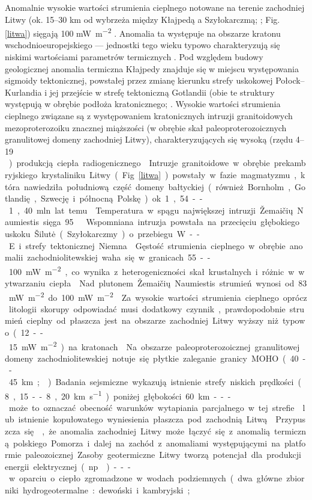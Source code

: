 \documentclass[11.5pt,twoside]{report}
\begin{document}
Anomalnie wysokie wartości strumienia cieplnego notowane na terenie zachodniej Litwy (ok. 15--30 km od wybrzeża między Kłajpedą a Szyłokarczmą; \cite{Lukosevicius.1993}; Fig. \ref{litwa}) sięgają 100 \si{\milli\watt\per\meter\squared} \parencite{Sliaupa.2012,Puura.2003}. Anomalia ta występuje na obszarze kratonu wschodnioeuropejskiego --- jednostki tego wieku typowo charakteryzują się niskimi wartościami parametrów termicznych \parencite{Suveizdis.2000}. Pod względem budowy geologicznej anomalia termiczna Kłajpedy znajduje się w miejscu występowania sigmoidy tektonicznej, powstałej przez zmianę kierunku strefy uskokowej Połock--Kurlandia i jej przejście w strefę tektoniczną Gotlandii (obie te struktury występują w obrębie podłoża kratonicznego; \parencite{Garetsky.2007}. Wysokie wartości strumienia cieplnego związane są z występowaniem kratonicznych intruzji granitoidowych mezoproterozoiku znacznej miąższości (w obrębie skał paleoproterozoicznych granulitowej domeny zachodniej Litwy), charakteryzujących się wysoką (rzędu 4--19 \si{\milli\watt\per\meter\cubic}) produkcją ciepła radiogenicznego \parencite{Sliaupa.2010,Sliaupa.2005,Motuza.2003}. Intruzje granitoidowe w obrębie prekambryjskiego krystaliniku Litwy (Fig. \ref{litwa}) powstały w fazie magmatyzmu, która nawiedziła południową część domeny bałtyckiej (również Bornholm, Gotlandię, Szwecję i północną Polskę) ok. 1,54--1,40 mln lat temu \parencite{Motuza.2008,Motuza.2006}. Temperatura w spągu największej intruzji Žemaičių Naumiestis sięga 95 \textcelsius \parencite{Sliaupa.2005}. Wspomniana intruzja powstała na przecięciu głębokiego uskoku Šilutė (Szyłokarczmy) o przebiegu W--E i strefy tektonicznej Niemna \parencite{Sliaupa.2005}. Gęstość strumienia cieplnego w obrębie anomalii zachodniolitewskiej waha się w granicach 55--100 \si{\milli\watt\per\meter\squared}, co wynika z heterogeniczności skał krustalnych i różnic w wytwarzaniu ciepła \parencite{Sliaupa.2005}. Nad plutonem Žemaičių Naumiestis strumień wynosi od 83 \si{\milli\watt\per\meter\squared} do 100 \si{\milli\watt\per\meter\squared} \parencite{Sliaupa.2005}. Za wysokie wartości strumienia cieplnego oprócz litologii skorupy odpowiadać musi dodatkowy czynnik, prawdopodobnie strumień cieplny od płaszcza jest na obszarze zachodniej Litwy wyższy niż typowo (12--15 \si{\milli\watt\per\meter\squared}) na kratonach \parencite{Motuza.2003}. Na obszarze paleoproterozoicznej granulitowej domeny zachodniolitewskiej notuje się płytkie zaleganie granicy MOHO (40--45 km; \cite{Sliaupa.2005,Suveizdis.2000}). Badania sejsmiczne wykazują istnienie strefy niskich prędkości (8,15--8,20 \si{\kilo\metre\per\second}) poniżej głębokości 60 km --- może to oznaczać obecność warunków wytapiania parcjalnego w tej strefie \parencite{Motuza.2003} lub istnienie kopułowatego wyniesienia płaszcza pod zachodnią Litwą \parencite{Janutyte.2014}. Przypuszcza się \parencite{Gordienko.1996}, że anomalia zachodniej Litwy może łączyć się z anomalią termiczną polskiego Pomorza i dalej na zachód z anomaliami występującymi na platformie paleozoicznej. Zasoby geotermiczne Litwy tworzą potencjał dla produkcji energii elektrycznej (np. \cite{Lukosevicius.1993,Sliaupa.2010}) --- w oparciu o ciepło zgromadzone w wodach podziemnych (dwa główne zbiorniki hydrogeotermalne: dewoński i kambryjski; 
\end{document}
